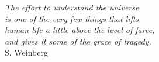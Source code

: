\begin{flushright}

\textit{
The effort to understand the universe\\
is one of the very few things that lifts\\
human life a little above the level of farce,\\
and gives it some of the grace of tragedy.\\
}
S. Weinberg\\


\end{flushright}